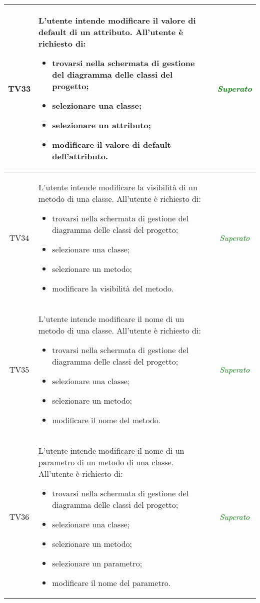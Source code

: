 \begin{longtable}{|c|>{}m{8cm}|c|}
\hypertarget{TV3.11.3.5}{TV33} & L'utente intende modificare il valore di default di un attributo.
All'utente è richiesto di:
\begin{itemize}
	\item trovarsi nella schermata di gestione del diagramma delle classi del progetto;
	\item selezionare una classe;
	\item selezionare un attributo;
	\item modificare il valore di default dell'attributo.
\end{itemize} & \textcolor{Green}{\textit{Superato}}\\ \hline

\hypertarget{TV3.11.4.1}{TV34} & L'utente intende modificare la visibilità di un metodo di una classe.
All'utente è richiesto di:
\begin{itemize}
	\item trovarsi nella schermata di gestione del diagramma delle classi del progetto;
	\item selezionare una classe;
	\item selezionare un metodo;
	\item modificare la visibilità del metodo.
\end{itemize} & \textcolor{Green}{\textit{Superato}}\\ \hline

\hypertarget{TV3.11.4.2}{TV35} & L'utente intende modificare il nome di un metodo di una classe.
All'utente è richiesto di:
\begin{itemize}
	\item trovarsi nella schermata di gestione del diagramma delle classi del progetto;
	\item selezionare una classe;
	\item selezionare un metodo;
	\item modificare il nome del metodo.
\end{itemize} & \textcolor{Green}{\textit{Superato}}\\ \hline

\hypertarget{TV3.11.4.3.1}{TV36} & L'utente intende modificare il nome di un parametro di un metodo di una classe.
All'utente è richiesto di:
\begin{itemize}
	\item trovarsi nella schermata di gestione del diagramma delle classi del progetto;
	\item selezionare una classe; 
	\item selezionare un metodo; 
	\item selezionare un parametro;
	\item modificare il nome del parametro.
\end{itemize} & \textcolor{Green}{\textit{Superato}}\\ \hline


\end{longtable}
